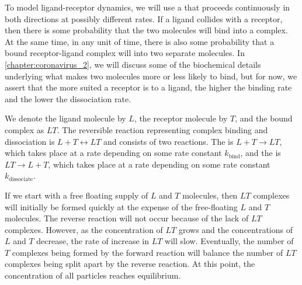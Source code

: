 To model ligand-receptor dynamics, we will use a  that proceeds continuously in both directions at possibly different rates. If a ligand collides with a receptor, then there is some probability that the two molecules will bind into a complex. At the same time, in any unit of time, there is also some probability that a bound receptor-ligand complex will  into two separate molecules. In \autoref{chapter:coronavirus_2}, we will discuss some of the biochemical details underlying what makes two molecules more or less likely to bind, but for now, we assert that the more suited a receptor is to a ligand, the higher the binding rate and the lower the dissociation rate.\\

\begin{note}\end{note}

We denote the ligand molecule by $L$, the receptor molecule by $T$, and the bound complex as $LT$. The reversible reaction representing complex binding and dissociation is $L + T \longleftrightarrow LT$ and consists of two reactions. The  is $L + T \rightarrow LT$, which takes place at a rate depending on some rate constant $k_\text{bind}$, and the  is $LT \rightarrow L + T$, which takes place at a rate depending on some rate constant $k_\text{dissociate}$.

If we start with a free floating supply of $L$ and $T$ molecules, then $LT$ complexes will initially be formed quickly at the expense of the free-floating $L$ and $T$ molecules. The reverse reaction will not occur because of the lack of $LT$ complexes. However, as the concentration of $LT$ grows and the concentrations of $L$ and $T$ decrease, the rate of increase in $LT$ will slow. Eventually, the number of $T$ complexes being formed by the forward reaction will balance the number of $LT$ complexes being split apart by the reverse reaction. At this point, the concentration of all particles reaches equilibrium.

